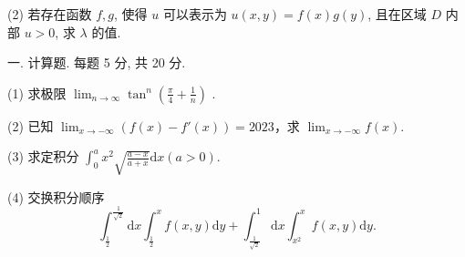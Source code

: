 \documentclass{examcollection}
\renewcommand{\displayformula}[1]{\[#1\]}
\begin{document}
{\begin{minipage}{\textwidth}
(2) 若存在函数 $f, g$, 使得 $u$ 可以表示为 $u(x, y) = f(x)g(y)$, 且在区域 $D$ 内部 $u > 0$, 求 $\lambda$ 的值.\par
{}\smallskip
一. 计算题. 每题 5 分, 共 20 分.\par
(1) 求极限  $\lim_{n\to\infty}\tan^{n}\left(\frac{\pi}{4}+\frac{1}{n}\right)$ .\par
(2) 已知 $\lim_{x\to -\infty}(f(x) - f'(x)) = 2023$，求 $\lim_{x\to -\infty}f(x)$.\par
(3) 求定积分 $\int_0^a x^2\sqrt{\frac{a - x}{a + x}}\mathrm{d}x (a > 0)$.\par
(4) 交换积分顺序 \displayformula{\int_{\frac{1}{2}}^{\frac{1}{\sqrt{2}}} \mathrm{d}x \int_{\frac{1}{2}}^{x} f(x, y) \mathrm{d}y + \int_{\frac{1}{\sqrt{2}}}^{1} \mathrm{d}x \int_{x^2}^{x} f(x, y) \mathrm{d}y.}\par
\end{minipage}}
\ifdim\dimexpr\ht\proofbox+\dp\proofbox\relax>\textheight
\noindent\resizebox{!}{\textheight}{\usebox{\proofbox}}\else\noindent\usebox{\proofbox}\fi\clearpage
\end{document}
